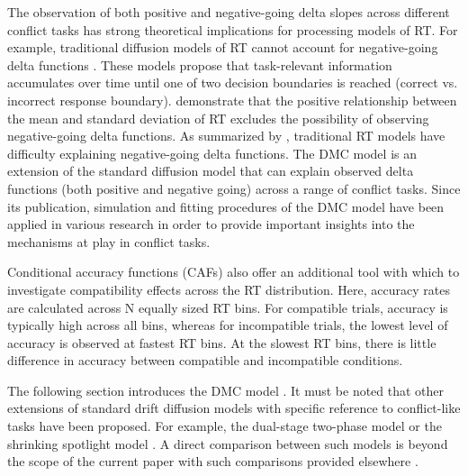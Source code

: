 The observation of both positive and negative-going delta slopes across
different conflict tasks has strong theoretical implications for processing
models of RT. For example, traditional diffusion models of RT cannot account
for negative-going delta functions \parencite{pratte2010exploring}. These
models propose that task-relevant information accumulates over time until one
of two decision boundaries is reached (correct vs. incorrect response
boundary). \textcite{wagenmakers2007linear} demonstrate that the positive
relationship between the mean and standard deviation of RT excludes the
possibility of observing negative-going delta functions. As summarized by
\textcite{ulrich2015automatic}, traditional RT models have difficulty
explaining negative-going delta functions. The DMC model is an extension of the
standard diffusion model that can explain observed delta functions (both
positive and negative going) across a range of conflict tasks. Since its
publication, simulation and fitting procedures of the DMC model have been
applied in various research \DIFdelbegin {}\DIFdelend \DIFaddbegin {}\DIFaddend in order to provide important insights into
the mechanisms at play in conflict tasks\parencite[e.g.,][]{servant2016,
mittelstadt2020beyond}.

Conditional accuracy functions (CAFs) also offer an additional tool with which
to investigate compatibility effects across the RT distribution. Here, accuracy
rates are calculated across N equally sized RT bins. For compatible trials,
accuracy is typically high across all bins, whereas for incompatible trials,
the lowest level of accuracy is observed at fastest RT bins. At the slowest RT
bins, there is little difference in accuracy between compatible and
incompatible conditions.

The following section introduces the DMC model \textcite{ulrich2015automatic}.
It must be noted that other extensions of standard drift diffusion models with
specific reference to conflict-like tasks have been proposed. For example, the
dual-stage two-phase model \DIFdelbegin {}\DIFdelend \DIFaddbegin \parencite[DSTP, ][]{hubner2010dual} \DIFaddend or the shrinking
spotlight model \DIFdelbegin {}\DIFdelend \DIFaddbegin \parencite[SSP, ][]{white2011diffusion}\DIFaddend . A direct comparison
between such models is beyond the scope of the current paper with such
comparisons provided elsewhere \parencite[see][albeit with specific reference
to the flanker task only]{white2018testing, evans2020comparison}.

